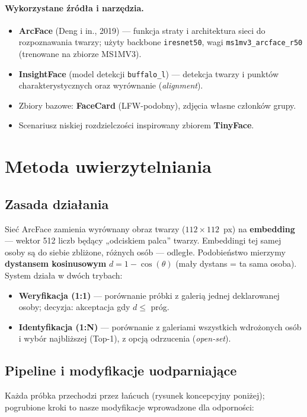 \documentclass[11pt,a4paper]{article}
\begin{document}
\paragraph{Wykorzystane źródła i narzędzia.}
\begin{itemize}[nosep]
\item \textbf{ArcFace} (Deng i in., 2019) --- funkcja straty i architektura sieci do
rozpoznawania twarzy; użyty backbone \texttt{iresnet50}, wagi \texttt{ms1mv3\_arcface\_r50}
(trenowane na zbiorze MS1MV3).
\item \textbf{InsightFace} (model detekcji \texttt{buffalo\_l}) --- detekcja twarzy i punktów
charakterystycznych oraz wyrównanie (\emph{alignment}).
\item Zbiory bazowe: \textbf{FaceCard} (LFW-podobny), zdjęcia własne członków grupy.
\item Scenariusz niskiej rozdzielczości inspirowany zbiorem \textbf{TinyFace}.
\end{itemize}

\section{Metoda uwierzytelniania}

\subsection{Zasada działania}
Sieć ArcFace zamienia wyrównany obraz twarzy ($112\times112$~px) na
\textbf{embedding} --- wektor 512 liczb będący „odciskiem palca” twarzy. Embeddingi tej samej
osoby są do siebie zbliżone, różnych osób --- odległe. Podobieństwo mierzymy
\textbf{dystansem kosinusowym} $d = 1 - \cos(\theta)$ (mały dystans = ta sama osoba).
System działa w dwóch trybach:
\begin{itemize}[nosep]
\item \textbf{Weryfikacja (1:1)} --- porównanie próbki z galerią jednej deklarowanej osoby;
decyzja: akceptacja gdy $d \le$ próg.
\item \textbf{Identyfikacja (1:N)} --- porównanie z galeriami wszystkich wdrożonych osób
i wybór najbliższej (Top-1), z opcją odrzucenia (\emph{open-set}).
\end{itemize}

\subsection{Pipeline i modyfikacje uodparniające}
Każda próbka przechodzi przez łańcuch (rysunek koncepcyjny poniżej); pogrubione kroki to
nasze modyfikacje wprowadzone dla odporności:
\end{document}
